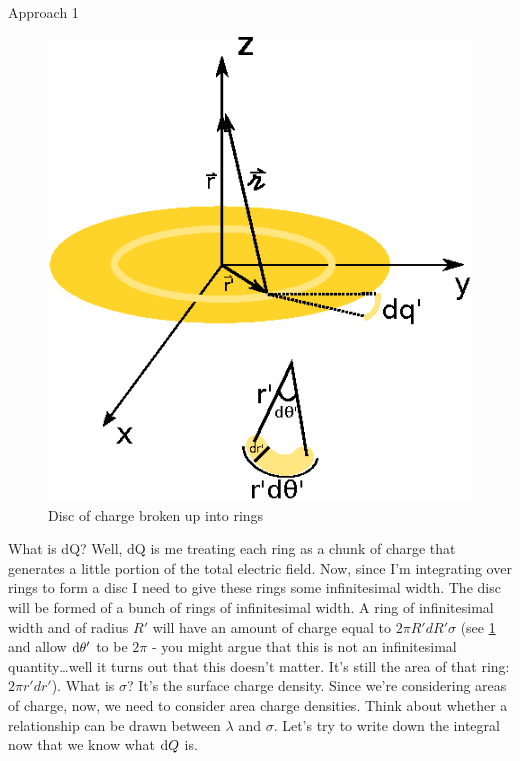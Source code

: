 \begin{homeworkProblem}
\begin{homeworkSection}{Approach 1}
        \begin{figure}[t]
            \begin{center}
                \includegraphics{./img/discofcharge.eps}
            \end{center}
            \caption{Disc of charge broken up into rings}
            \label{fig:doc.eps}
        \end{figure}

        What is dQ? Well, dQ is me treating each ring as a chunk of
        charge that generates a little portion of the total electric
        field. Now, since I'm integrating over rings to form a disc I
        need to give these rings some infinitesimal width. The disc will
        be formed of a bunch of rings of infinitesimal width. A ring of
        infinitesimal width and of radius $R'$ will have an amount of
        charge equal to $2 \pi R' dR' \sigma$ (see \ref{fig:doc.eps} and
        allow $\mathop{}\!\mathrm{d} \theta'$ to be $2 \pi$ - you might argue that this
        is not an infinitesimal quantity\dots well it turns out that
        this doesn't matter. It's still the area of that ring: $2\pi r'
        dr'$). What is $\sigma$? It's the surface charge density. Since
        we're considering areas of charge, now, we need to consider area
        charge densities. Think about whether a relationship can be
        drawn between $\lambda$ and $\sigma$. Let's try to write down
        the integral now that we know what $\mathop{}\!\mathrm{d} Q$ is.


\end{homeworkSection}
\end{homeworkProblem}
